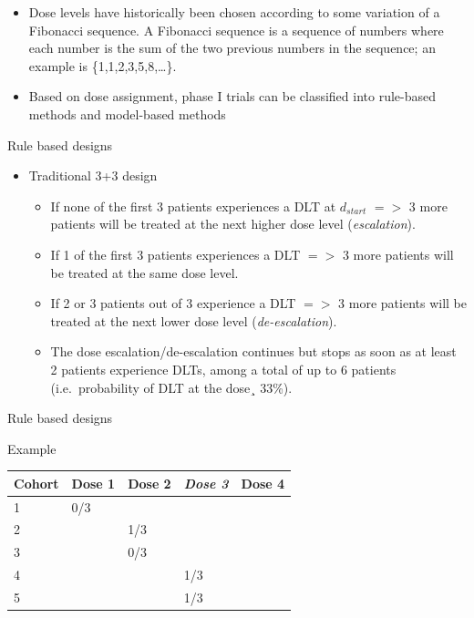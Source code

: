 \documentclass{beamer}
\begin{document}
\begin{frame}

\begin{itemize}
\item
  Dose levels have historically been chosen according to some variation
  of a Fibonacci sequence. A Fibonacci sequence is a sequence of numbers
  where each number is the sum of the two previous numbers in the
  sequence; an example is \{1,1,2,3,5,8,\ldots{}\}.
\item
  Based on dose assignment, phase I trials can be classified into
  rule-based methods and model-based methods
\end{itemize}

\end{frame}

\begin{frame}{Rule based designs}

\begin{itemize}
\itemsep1pt\parskip0pt
\item
  Traditional 3+3 design

  \begin{itemize}
  \itemsep1pt\parskip0pt
  \item
    If none of the first 3 patients experiences a DLT at \(d_{start}\)
    \(=>\) 3 more patients will be treated at the next higher dose level
    (\emph{escalation}).
  \item
    If 1 of the first 3 patients experiences a DLT \(=>\) 3 more
    patients will be treated at the same dose level.
  \item
    If 2 or 3 patients out of 3 experience a DLT \(=>\) 3 more patients
    will be treated at the next lower dose level (\emph{de-escalation}).
  \item
    The dose escalation/de-escalation continues but stops as soon as at
    least 2 patients experience DLTs, among a total of up to 6 patients
    (i.e.~probability of DLT at the dose¸ 33\%).
  \end{itemize}
\end{itemize}

\end{frame}

\begin{frame}{Rule based designs}

Example

\begin{longtable}[c]{@{}lllll@{}}
\toprule
Cohort & Dose 1 & Dose 2 & \emph{Dose 3} & Dose 4\tabularnewline
\midrule
\endhead
1 & 0/3 & & &\tabularnewline
2 & & 1/3 & &\tabularnewline
3 & & 0/3 & &\tabularnewline
4 & & & 1/3 &\tabularnewline
5 & & & 1/3 &\tabularnewline
\bottomrule
\end{longtable}

\end{frame}
\end{document}
